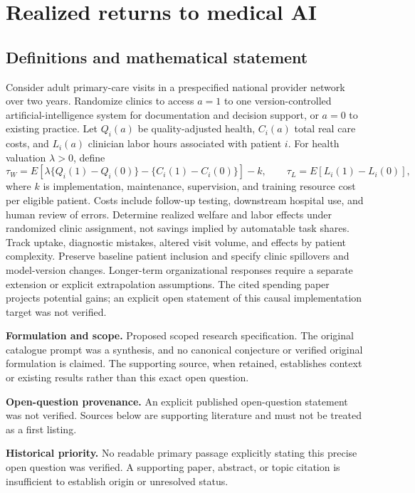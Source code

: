 \documentclass[11pt]{article}
\begin{document}
\section*{Realized returns to medical AI}\label{30007729}
\subsection{Definitions and mathematical statement}
Consider adult primary-care visits in a prespecified national provider network over two years. Randomize clinics to access \(a=1\) to one version-controlled artificial-intelligence system for documentation and decision support, or \(a=0\) to existing practice. Let \(Q_i(a)\) be quality-adjusted health, \(C_i(a)\) total real care costs, and \(L_i(a)\) clinician labor hours associated with patient \(i\). For health valuation \(\lambda>0\), define
\[\tau_W=E[\lambda\{Q_i(1)-Q_i(0)\}-\{C_i(1)-C_i(0)\}]-k,\qquad\tau_L=E[L_i(1)-L_i(0)],\]
where \(k\) is implementation, maintenance, supervision, and training resource cost per eligible patient. Costs include follow-up testing, downstream hospital use, and human review of errors. Determine realized welfare and labor effects under randomized clinic assignment, not savings implied by automatable task shares. Track uptake, diagnostic mistakes, altered visit volume, and effects by patient complexity. Preserve baseline patient inclusion and specify clinic spillovers and model-version changes. Longer-term organizational responses require a separate extension or explicit extrapolation assumptions. The cited spending paper projects potential gains; an explicit open statement of this causal implementation target was not verified.

\par\textbf{Formulation and scope.} Proposed scoped research specification. The original catalogue prompt was a synthesis, and no canonical conjecture or verified original formulation is claimed. The supporting source, when retained, establishes context or existing results rather than this exact open question.

\par\textbf{Open-question provenance.} An explicit published open-question statement was not verified. Sources below are supporting literature and must not be treated as a first listing.

\par\textbf{Historical priority.} No readable primary passage explicitly stating this precise open question was verified. A supporting paper, abstract, or topic citation is insufficient to establish origin or unresolved status.
\end{document}
